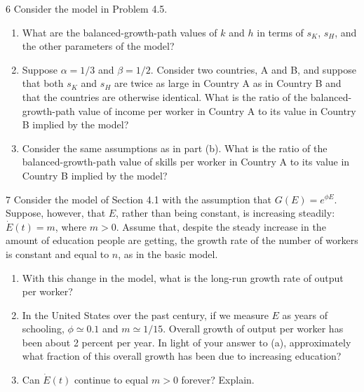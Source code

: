 \begin{problem}{6}
Consider the model in Problem 4.5.
\begin{enumerate}[label=(\alph*)]
    \item What are the balanced-growth-path values of \(k\) and \(h\) in terms of \(s_K\), \(s_H\), and the other parameters of the model?
    \item Suppose \(\alpha=1/3\) and \(\beta=1/2\). Consider two countries, A and B, and suppose that both \(s_K\) and \(s_H\) are twice as large in Country A as in Country B and that the countries are otherwise identical. What is the ratio of the balanced-growth-path value of income per worker in Country A to its value in Country B implied by the model?
    \item Consider the same assumptions as in part (b). What is the ratio of the balanced-growth-path value of skills per worker in Country A to its value in Country B implied by the model?
\end{enumerate}
\end{problem}

\begin{problem}{7}
Consider the model of Section 4.1 with the assumption that \(G\left(E\right)=e^{\phi E}\). Suppose, however, that \(E\), rather than being constant, is increasing steadily: \(\dot{E}\left(t\right)=m\), where \(m>0\). Assume that, despite the steady increase in the amount of education people are getting, the growth rate of the number of workers is constant and equal to \(n\), as in the basic model.
\begin{enumerate}[label=(\alph*)]
    \item With this change in the model, what is the long-run growth rate of output per worker?
    \item In the United States over the past century, if we measure \(E\) as years of schooling, \(\phi\simeq0.1\) and \(m\simeq1/15\). Overall growth of output per worker has been about 2 percent per year. In light of your answer to (a), approximately what fraction of this overall growth has been due to increasing education?
    \item Can \(\dot{E}\left(t\right)\) continue to equal \(m>0\) forever? Explain.
\end{enumerate}
\end{problem}


